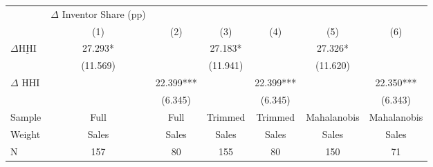 {
\def\sym#1{\ifmmode^{#1}\else\(^{#1}\)\fi}
\begin{tabular}{l*{6}{c}}
\hline\hline
                    &$\Delta$ Inventor Share (pp)   &               &               &               &               &               \\
                    &\multicolumn{1}{c}{(1)}   &\multicolumn{1}{c}{(2)}   &\multicolumn{1}{c}{(3)}   &\multicolumn{1}{c}{(4)}   &\multicolumn{1}{c}{(5)}   &\multicolumn{1}{c}{(6)}   \\
\hline
$\Delta \underline{\text{HHI}}$&      27.293*  &               &      27.183*  &               &      27.326*  &               \\
                    &    (11.569)   &               &    (11.941)   &               &    (11.620)   &               \\
$\Delta$ HHI        &               &      22.399***&               &      22.399***&               &      22.350***\\
                    &               &     (6.345)   &               &     (6.345)   &               &     (6.343)   \\
\hline
Sample              & Full   & Full   &Trimmed   &Trimmed   &Mahalanobis &Mahalanobis \\
Weight              &       Sales   &       Sales   &       Sales   &       Sales   &       Sales   &       Sales   \\
N        &         157   &          80   &         155   &          80   &         150   &          71   \\
\hline\hline
\end{tabular}
}
